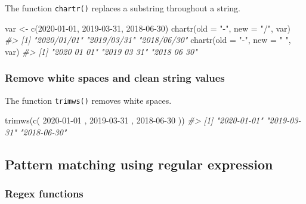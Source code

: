 \documentclass[
]{book}
\newenvironment{Shaded}{\begin{snugshade}}{\end{snugshade}}
\newcommand{\AttributeTok}[1]{\textcolor[rgb]{0.77,0.63,0.00}{#1}}
\newcommand{\CommentTok}[1]{\textcolor[rgb]{0.56,0.35,0.01}{\textit{#1}}}
\newcommand{\FunctionTok}[1]{\textcolor[rgb]{0.00,0.00,0.00}{#1}}
\newcommand{\NormalTok}[1]{#1}
\newcommand{\OtherTok}[1]{\textcolor[rgb]{0.56,0.35,0.01}{#1}}
\newcommand{\StringTok}[1]{\textcolor[rgb]{0.31,0.60,0.02}{#1}}
\begin{document}
The function \texttt{chartr()} replaces a substring throughout a string.

\begin{Shaded}
\begin{Highlighting}[]
\NormalTok{var }\OtherTok{\textless{}{-}} \FunctionTok{c}\NormalTok{(}\StringTok{\textquotesingle{}2020{-}01{-}01\textquotesingle{}}\NormalTok{, }\StringTok{\textquotesingle{}2019{-}03{-}31\textquotesingle{}}\NormalTok{, }\StringTok{\textquotesingle{}2018{-}06{-}30\textquotesingle{}}\NormalTok{)}
\FunctionTok{chartr}\NormalTok{(}\AttributeTok{old =} \StringTok{"{-}"}\NormalTok{, }\AttributeTok{new =} \StringTok{"/"}\NormalTok{, var)}
\CommentTok{\#\textgreater{} [1] "2020/01/01" "2019/03/31" "2018/06/30"}
\FunctionTok{chartr}\NormalTok{(}\AttributeTok{old =} \StringTok{"{-}"}\NormalTok{, }\AttributeTok{new =} \StringTok{" "}\NormalTok{, var)}
\CommentTok{\#\textgreater{} [1] "2020 01 01" "2019 03 31" "2018 06 30"}
\end{Highlighting}
\end{Shaded}

\hypertarget{remove-white-spaces-and-clean-string-values}{%
\subsubsection{Remove white spaces and clean string values}\label{remove-white-spaces-and-clean-string-values}}

The function \texttt{trimws()} removes white spaces.

\begin{Shaded}
\begin{Highlighting}[]
\FunctionTok{trimws}\NormalTok{(}\FunctionTok{c}\NormalTok{(}\StringTok{\textquotesingle{} 2020{-}01{-}01 \textquotesingle{}}\NormalTok{, }\StringTok{\textquotesingle{} 2019{-}03{-}31 \textquotesingle{}}\NormalTok{, }\StringTok{\textquotesingle{} 2018{-}06{-}30 \textquotesingle{}}\NormalTok{))}
\CommentTok{\#\textgreater{} [1] "2020{-}01{-}01" "2019{-}03{-}31" "2018{-}06{-}30"}
\end{Highlighting}
\end{Shaded}

\hypertarget{pattern-matching-using-regular-expression}{%
\subsection{Pattern matching using regular expression}\label{pattern-matching-using-regular-expression}}

\hypertarget{regex-functions}{%
\subsubsection{Regex functions}\label{regex-functions}}
\end{document}
